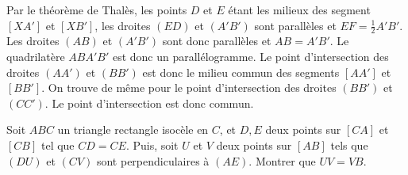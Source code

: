 \begin{sol}
\begin{center}
\end{center}

Par le théorème de Thalès, les points $D$ et $E$ étant les milieux des segment $[XA']$ et $[XB']$, les droites $(ED)$ et $(A'B')$ sont parallèles et $EF=\frac1{2}A'B'$. Les droites $(AB)$ et $(A'B')$ sont donc parallèles et $AB=A'B'$. Le quadrilatère $ABA'B'$ est donc un parallélogramme. Le point d'intersection des droites $(AA')$ et $(BB')$ est donc le milieu commun des segments $[AA']$ et $[BB']$. On trouve de même pour le point d'intersection des droites $(BB')$ et $(CC')$. Le point d'intersection est donc commun.
\end{sol}

\begin{exo}
Soit $ABC$ un triangle rectangle isocèle en $C$, et $D,E$ deux points sur $[CA]$ et $[CB]$ tel que $CD=CE$. Puis, soit $U$ et $V$ deux points sur $[AB]$ tels que $(DU)$ et $(CV)$ sont perpendiculaires à $(AE)$. Montrer que $UV=VB$.
\end{exo}

